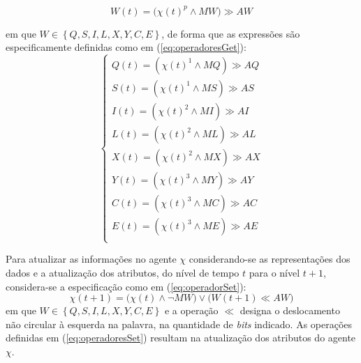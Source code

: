 \begin{equation}
 W(t)=\big(\chi(t)^p\wedge MW\big)\gg AW
 \label{eq:operadorGet}
\end{equation}

em que $W \in \left\{Q, S, I, L, X, Y, C, E\right\}$, de forma que as expressões são especificamente definidas como em (\ref{eq:operadoresGet}):
\begin{equation}
 \begin{cases}
 Q(t) = (\chi(t)^1\wedge MQ) \gg AQ \\
 S(t) = (\chi(t)^1\wedge MS) \gg AS \\
 
 I(t) = (\chi(t)^2\wedge MI) \gg AI \\
 L(t) = (\chi(t)^2\wedge ML) \gg AL \\
 X(t) = (\chi(t)^2\wedge MX) \gg AX \\
 
 Y(t) = (\chi(t)^3\wedge MY) \gg AY \\
 C(t) = (\chi(t)^3\wedge MC) \gg AC \\
 E(t) = (\chi(t)^3\wedge ME) \gg AE \\
 \end{cases}
 \label{eq:operadoresGet}
\end{equation}

Para atualizar as informações no agente $\chi$ considerando-se as representações dos dados e a atualização dos atributos, do nível de tempo $t$ para o nível $t+1$, considera-se a especificação como em (\ref{eq:operadorSet}):
\begin{equation}
 \chi(t+1)=\big(\chi(t)\wedge \neg MW\big)\vee \big(W(t+1) \ll AW\big)
 \label{eq:operadorSet}
\end{equation}
em que $W \in \left\{Q, S, I, L, X, Y, C, E\right\}$ e a operação $\ll$ designa o deslocamento não circular à esquerda na palavra, na quantidade de \textit{bits} indicado. As operações definidas em (\ref{eq:operadoresSet}) resultam na atualização dos atributos do agente $\chi$.

